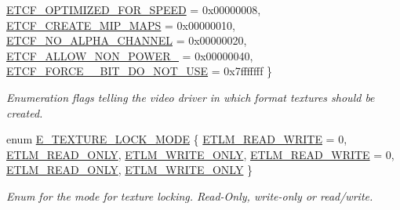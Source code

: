 \begin{DoxyCompactItemize}
\hyperlink{namespaceirr_1_1video_acaf6f7414534f7d62bff18c5bf11876faf43ab5c00fdf773dfeae1ed6380a662a}{E\+T\+C\+F\+\_\+\+O\+P\+T\+I\+M\+I\+Z\+E\+D\+\_\+\+F\+O\+R\+\_\+\+S\+P\+E\+ED} = 0x00000008, 
\newline
\hyperlink{namespaceirr_1_1video_acaf6f7414534f7d62bff18c5bf11876fa17c818cc743db8a0d9d991911812e4a0}{E\+T\+C\+F\+\_\+\+C\+R\+E\+A\+T\+E\+\_\+\+M\+I\+P\+\_\+\+M\+A\+PS} = 0x00000010, 
\hyperlink{namespaceirr_1_1video_acaf6f7414534f7d62bff18c5bf11876fa651fbb01805b4b9ec17f79eadfe11863}{E\+T\+C\+F\+\_\+\+N\+O\+\_\+\+A\+L\+P\+H\+A\+\_\+\+C\+H\+A\+N\+N\+EL} = 0x00000020, 
\hyperlink{namespaceirr_1_1video_acaf6f7414534f7d62bff18c5bf11876faa2ab03667e399d581bd0a612eec6c281}{E\+T\+C\+F\+\_\+\+A\+L\+L\+O\+W\+\_\+\+N\+O\+N\+\_\+\+P\+O\+W\+E\+R\+\_} = 0x00000040, 
\hyperlink{namespaceirr_1_1video_acaf6f7414534f7d62bff18c5bf11876fa38ea0c1f596277976d32ec70113443b0}{E\+T\+C\+F\+\_\+\+F\+O\+R\+C\+E\+\_\+\_\+\+B\+I\+T\+\_\+\+D\+O\+\_\+\+N\+O\+T\+\_\+\+U\+SE} = 0x7fffffff
 \}\begin{DoxyCompactList}\small\item\em Enumeration flags telling the video driver in which format textures should be created. \end{DoxyCompactList}
\item 
enum \hyperlink{namespaceirr_1_1video_a3916d259e8fe0d0d02e8ee0adc8af5bc}{E\+\_\+\+T\+E\+X\+T\+U\+R\+E\+\_\+\+L\+O\+C\+K\+\_\+\+M\+O\+DE} \{ \newline
\hyperlink{namespaceirr_1_1video_a3916d259e8fe0d0d02e8ee0adc8af5bcad742bd0e885e6a08c86b8d3d5c601952}{E\+T\+L\+M\+\_\+\+R\+E\+A\+D\+\_\+\+W\+R\+I\+TE} = 0, 
\hyperlink{namespaceirr_1_1video_a3916d259e8fe0d0d02e8ee0adc8af5bcac93387433366481313cc5a3ac4a8433d}{E\+T\+L\+M\+\_\+\+R\+E\+A\+D\+\_\+\+O\+N\+LY}, 
\hyperlink{namespaceirr_1_1video_a3916d259e8fe0d0d02e8ee0adc8af5bcaed6cea09a8a6ecc64d6001b17f1af0a8}{E\+T\+L\+M\+\_\+\+W\+R\+I\+T\+E\+\_\+\+O\+N\+LY}, 
\hyperlink{namespaceirr_1_1video_a3916d259e8fe0d0d02e8ee0adc8af5bcad742bd0e885e6a08c86b8d3d5c601952}{E\+T\+L\+M\+\_\+\+R\+E\+A\+D\+\_\+\+W\+R\+I\+TE} = 0, 
\newline
\hyperlink{namespaceirr_1_1video_a3916d259e8fe0d0d02e8ee0adc8af5bcac93387433366481313cc5a3ac4a8433d}{E\+T\+L\+M\+\_\+\+R\+E\+A\+D\+\_\+\+O\+N\+LY}, 
\hyperlink{namespaceirr_1_1video_a3916d259e8fe0d0d02e8ee0adc8af5bcaed6cea09a8a6ecc64d6001b17f1af0a8}{E\+T\+L\+M\+\_\+\+W\+R\+I\+T\+E\+\_\+\+O\+N\+LY}
 \}\begin{DoxyCompactList}\small\item\em Enum for the mode for texture locking. Read-\/\+Only, write-\/only or read/write. \end{DoxyCompactList}

\end{DoxyCompactItemize}
